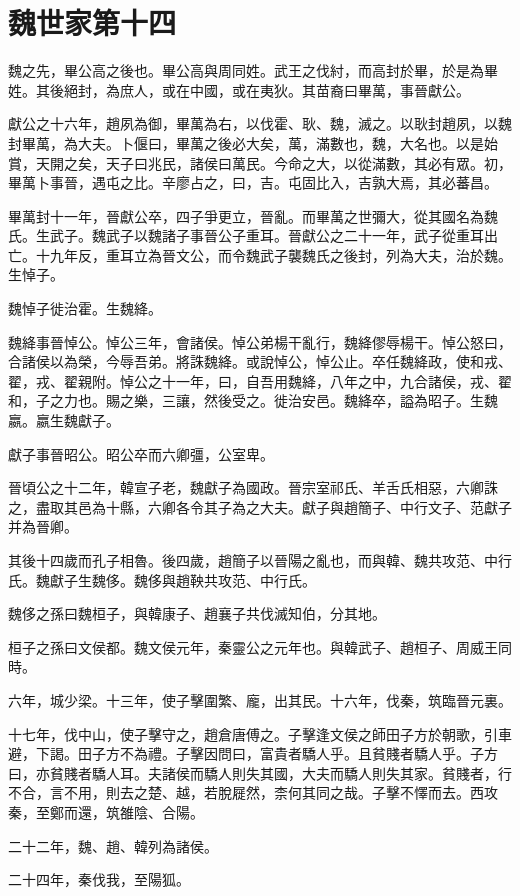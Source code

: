 \chapter{魏世家第十四}

魏之先，畢公高之後也。畢公高與周同姓。武王之伐紂，而高封於畢，於是為畢姓。其後絕封，為庶人，或在中國，或在夷狄。其苗裔曰畢萬，事晉獻公。

獻公之十六年，趙夙為御，畢萬為右，以伐霍、耿、魏，滅之。以耿封趙夙，以魏封畢萬，為大夫。卜偃曰，畢萬之後必大矣，萬，滿數也，魏，大名也。以是始賞，天開之矣，天子曰兆民，諸侯曰萬民。今命之大，以從滿數，其必有眾。初，畢萬卜事晉，遇屯之比。辛廖占之，曰，吉。屯固比入，吉孰大焉，其必蕃昌。

畢萬封十一年，晉獻公卒，四子爭更立，晉亂。而畢萬之世彌大，從其國名為魏氏。生武子。魏武子以魏諸子事晉公子重耳。晉獻公之二十一年，武子從重耳出亡。十九年反，重耳立為晉文公，而令魏武子襲魏氏之後封，列為大夫，治於魏。生悼子。

魏悼子徙治霍。生魏絳。

魏絳事晉悼公。悼公三年，會諸侯。悼公弟楊干亂行，魏絳僇辱楊干。悼公怒曰，合諸侯以為榮，今辱吾弟。將誅魏絳。或說悼公，悼公止。卒任魏絳政，使和戎、翟，戎、翟親附。悼公之十一年，曰，自吾用魏絳，八年之中，九合諸侯，戎、翟和，子之力也。賜之樂，三讓，然後受之。徙治安邑。魏絳卒，謚為昭子。生魏嬴。嬴生魏獻子。

獻子事晉昭公。昭公卒而六卿彊，公室卑。

晉頃公之十二年，韓宣子老，魏獻子為國政。晉宗室祁氏、羊舌氏相惡，六卿誅之，盡取其邑為十縣，六卿各令其子為之大夫。獻子與趙簡子、中行文子、范獻子并為晉卿。

其後十四歲而孔子相魯。後四歲，趙簡子以晉陽之亂也，而與韓、魏共攻范、中行氏。魏獻子生魏侈。魏侈與趙鞅共攻范、中行氏。

魏侈之孫曰魏桓子，與韓康子、趙襄子共伐滅知伯，分其地。

桓子之孫曰文侯都。魏文侯元年，秦靈公之元年也。與韓武子、趙桓子、周威王同時。

六年，城少梁。十三年，使子擊圍繁、龐，出其民。十六年，伐秦，筑臨晉元裏。

十七年，伐中山，使子擊守之，趙倉唐傅之。子擊逢文侯之師田子方於朝歌，引車避，下謁。田子方不為禮。子擊因問曰，富貴者驕人乎。且貧賤者驕人乎。子方曰，亦貧賤者驕人耳。夫諸侯而驕人則失其國，大夫而驕人則失其家。貧賤者，行不合，言不用，則去之楚、越，若脫屣然，柰何其同之哉。子擊不懌而去。西攻秦，至鄭而還，筑雒陰、合陽。

二十二年，魏、趙、韓列為諸侯。

二十四年，秦伐我，至陽狐。


